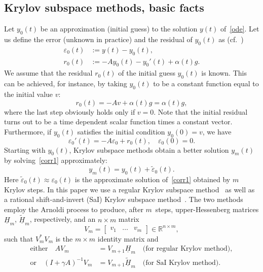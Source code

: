 \documentclass[11pt]{elsarticle}
\newcommand{\eps}{\varepsilon}
\newcommand{\Hh}{\underline{H}}
\newcommand{\Hht}{\underline{\tilde{H}}}
\newcommand{\Rr}{\mathbb{R}}
\begin{document}
\subsection{Krylov subspace methods, basic facts}
\label{sect:Kr1}
Let $y_0(t)$ be an approximation (initial guess) to the solution
$y(t)$ of~\eqref{ode}.
Let us define the error (unknown in practice) and the 
residual of $y_0(t)$ as 
(cf.~\cite{CelledoniMoret97,DruskinGreenbaumKnizhnerman98,%
KnizhnermanSimoncini09})
\begin{equation}
\label{err_res}
\begin{aligned}
\eps_0(t) & := y(t) - y_0(t),
\\
r_0(t) & := -Ay_0(t) - y_0'(t) + \alpha(t) g.
\end{aligned}
\end{equation}
We assume that the residual $r_0(t)$ of the initial guess $y_0(t)$ 
is known.  This can be 
achieved, for instance, by taking $y_0(t)$ to be a constant 
function equal to the initial value $v$:
\begin{equation}
\label{rank1}  
r_0(t) = -Av + \alpha(t) g = \alpha(t) g,
\end{equation}
where the last step obviously holds only if $v=0$.
Note that the initial residual turns out to be 
a time dependent scalar function times a constant vector.
Furthermore, if $y_0(t)$ satisfies the initial condition $y_0(0)=v$,
we have
\begin{equation}
\label{corr1}
\eps_0'(t) = -A\eps_0 + r_0(t), \quad \eps_0(0) = 0.
\end{equation}
Starting with $y_0(t)$, Krylov subspace methods obtain 
a better solution $y_m(t)$ by solving~\eqref{corr1}
approximately:
\begin{equation}
\label{upd1}
y_m(t) = y_0(t) + \tilde{\eps}_0(t).
\end{equation}
Here $\tilde{\eps}_0(t)\approx\eps_0(t)$ is the approximate solution of~\eqref{corr1}
obtained by $m$ Krylov steps.
In this paper we use a regular Krylov 
subspace method~\cite{SaadBook2003,Henk:book}
as well as a rational shift-and-invert (SaI) Krylov subspace 
method~\cite{MoretNovati04,EshofHochbruck06}.  The two methods employ the
Arnoldi process to produce, after $m$~steps, 
upper-Hessenberg matrices $\Hh_m$, $\Hht_m$,
respectively, and an $n\times m$ matrix  
$$
V_m = 
\begin{bmatrix}
v_1 & \dots & v_m  
\end{bmatrix}\in\Rr^{n\times m},
$$
such that $V_m^*V_m$ is the $m\times m$ identity matrix and 
\begin{equation}
\label{Arn}
\begin{aligned}
\text{either}\quad AV_m &= V_{m+1}\Hh_m   \quad\text{(for regular Krylov 
method)},
\\
\text{or}\quad (I+\gamma A)^{-1}V_m &= V_{m+1}\Hht_m   
\quad\text{(for SaI Krylov method)}.
\end{aligned}
\end{equation}
\end{document}
